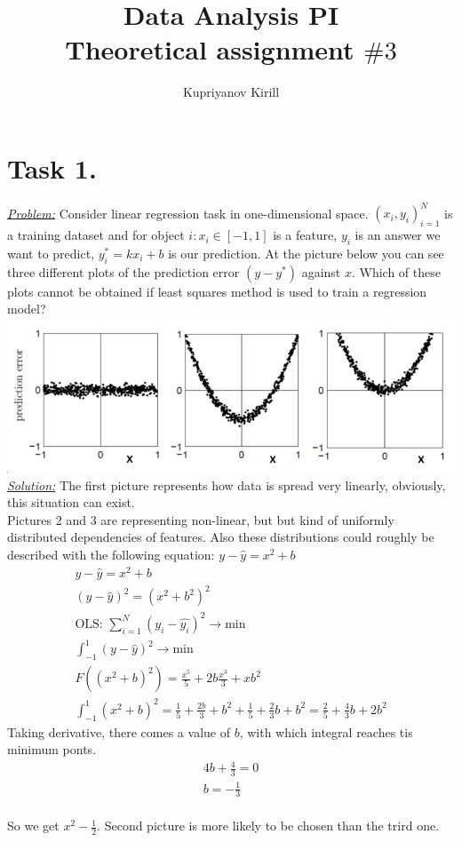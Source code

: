 \documentclass[a4paper,12pt]{article}
\author{Kupriyanov Kirill}
\title{Data Analysis PI\\Theoretical assignment $\#3$}
\date{}
\begin{document}
\maketitle
\thispagestyle{empty}
\newpage
\section*{Task 1.}
\underline{\textit{Problem:}} Consider linear regression task in
one-dimensional space. \({(x_i , y_i)}^N_{i=1}\) is a training dataset and
for object \(i: x_i \in [-1, 1]\) is a feature, $y_i$ is an answer we want to
predict, $y_i^*=kx_i+b$ is our prediction. At the picture below you can see
three different plots of the prediction error \((y - y^*)\) against $x$. Which of
these plots cannot be obtained if least squares method is used to train a
regression model?\\
\includegraphics[width=\textwidth]{1}
\newline
\underline{\textit{Solution:}} The first picture represents how data is spread very linearly, obviously, this situation can exist.\\
Pictures 2 and 3 are representing non-linear, but but kind of uniformly
distributed dependencies of features. Also these distributions could roughly be described with the following equation: \(y - \hat{y} = x^2+b\)
\begin{gather}
    y - \hat{y} = x^2 + b\\
    (y - \hat{y})^2 = (x^2 + b^2)^2\\
    \text{OLS: } \sum^{N}_{i = 1}{(y_i - \hat{y_i})^2} \rightarrow \text{min}\\
    \int_{-1}^{1} (y - \hat{y})^2  \rightarrow \text{min}\\
    F((x^2+b)^2) = \frac{x^5}{5} + 2b\frac{x^3}{3} + xb^2\\
    \int_{-1}^{1}(x^2 + b)^2 = \frac{1}{5}+\frac{2b}{3} + b^2 + \frac{1}{5} + \frac{2}{3}b + b^2 = \frac{2}{5} + \frac{4}{3}b + 2b^2
\end{gather}
Taking derivative, there comes a value of $b$, with which integral reaches tis minimum ponts.
\begin{gather}
    4b + \frac{4}{3} = 0\\
    b = -\frac{1}{3}
\end{gather}\\
So we get  $x^2 - \frac{1}{2}$. Second picture is more likely to be chosen than the trird one. 
\end{document}
